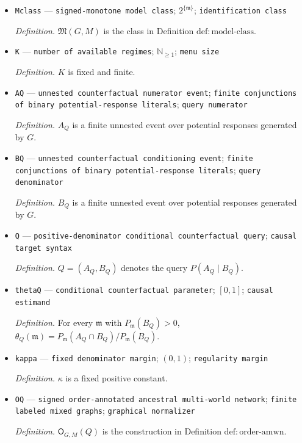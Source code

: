 \documentclass{article}
\begin{document}
\begin{itemize}
  \item \texttt{Mclass} --- \texttt{signed-\allowbreak{}monotone model class}; \(2^{\{\mathfrak m\}}\); \texttt{identification class}
  \par\smallskip\noindent\emph{Definition.} \(\mathfrak M(G,M)\) is the class in Definition \(\mathrm{def:model\text{-}class}\).
  \item \texttt{K} --- \texttt{number of available regimes}; \(\mathbb N_{\ge 1}\); \texttt{menu size}
  \par\smallskip\noindent\emph{Definition.} \(K\) is fixed and finite.
  \item \texttt{AQ} --- \texttt{unnested counterfactual numerator event}; \texttt{finite conjunctions of binary potential-\allowbreak{}response literals}; \texttt{query numerator}
  \par\smallskip\noindent\emph{Definition.} \(A_Q\) is a finite unnested event over potential responses generated by \(G\).
  \item \texttt{BQ} --- \texttt{unnested counterfactual conditioning event}; \texttt{finite conjunctions of binary potential-\allowbreak{}response literals}; \texttt{query denominator}
  \par\smallskip\noindent\emph{Definition.} \(B_Q\) is a finite unnested event over potential responses generated by \(G\).
  \item \texttt{Q} --- \texttt{positive-\allowbreak{}denominator conditional counterfactual query}; \texttt{causal target syntax}
  \par\smallskip\noindent\emph{Definition.} \(Q=(A_Q,B_Q)\) denotes the query \(P(A_Q\mid B_Q)\).
  \item \texttt{thetaQ} --- \texttt{conditional counterfactual parameter}; \([0,1]\); \texttt{causal estimand}
  \par\smallskip\noindent\emph{Definition.} For every \(\mathfrak m\) with \(P_{\mathfrak m}(B_Q)>0\), \(\theta_Q(\mathfrak m)=P_{\mathfrak m}(A_Q\cap B_Q)/P_{\mathfrak m}(B_Q)\).
  \item \texttt{kappa} --- \texttt{fixed denominator margin}; \((0,1)\); \texttt{regularity margin}
  \par\smallskip\noindent\emph{Definition.} \(\kappa\) is a fixed positive constant.
  \item \texttt{OQ} --- \texttt{signed order-\allowbreak{}annotated ancestral multi-\allowbreak{}world network}; \texttt{finite labeled mixed graphs}; \texttt{graphical normalizer}
  \par\smallskip\noindent\emph{Definition.} \(\mathsf O_{G,M}(Q)\) is the construction in Definition \(\mathrm{def:order\text{-}amwn}\).

\end{itemize}
\end{document}
